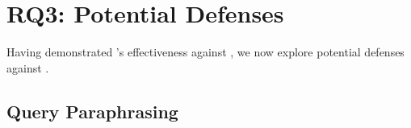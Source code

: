 

\section{RQ3: Potential Defenses}
\label{sec:rq3}

Having demonstrated \attack's effectiveness against \rag, we now explore potential defenses against \attack. 



\subsection{Query Paraphrasing}




